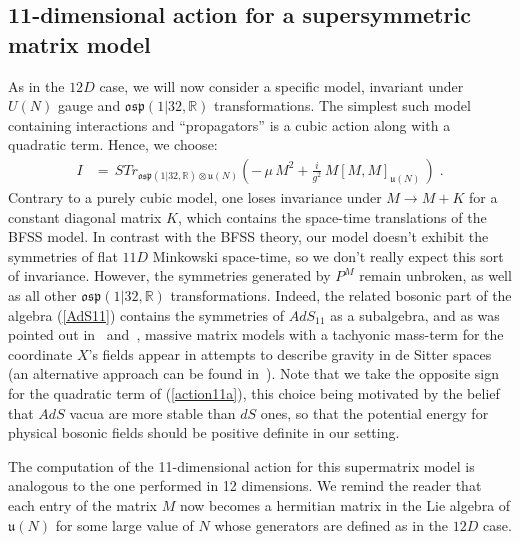 \documentclass[a4paper,11pt]{article}
\begin{document}
\subsection{11-dimensional action for a supersymmetric matrix model} 
As in the $12D$ case, we will now consider a specific model, invariant
under $U(N)$ gauge and $\mathfrak{osp}(1|32,\mathbb{R})$ transformations.
The simplest such model containing interactions and ``propagators'' is a
cubic action along with a quadratic term. 
Hence, we choose:
\begin{align}\label{action11a}
I & =\, STr_{\mathfrak{osp}(1|32,\mathbb{R})\otimes\mathfrak{u}(N)} 
\left(-\,\mu\, M^2 + \frac{i}{g^2}\,M[M,M]_{\mathfrak{u}(N)}\,\right)\;.
\end{align}
Contrary to a purely cubic model, one loses invariance under $M \rightarrow M+K$ for a constant
diagonal matrix $K$, which contains the space-time translations of the BFSS model.
In contrast with the BFSS theory, our model doesn't exhibit the symmetries of flat $11D$ Minkowski 
space-time, so we don't really expect this sort of invariance. 
However, the symmetries generated by $P^M$ remain unbroken, as well as all other 
$\mathfrak{osp}(1|32,\mathbb{R})$ transformations.  Indeed, the related
bosonic part of the algebra (\ref{AdS11}) contains the symmetries of $AdS_{11}$
as a subalgebra, and as was pointed out in~\cite{Gao} and~\cite{Cham}, massive
matrix models with a tachyonic mass-term for the coordinate $X$'s fields appear 
in attempts to describe gravity in de Sitter spaces (an alternative approach can
be found in~\cite{Li}). Note that we take the opposite sign for
the quadratic term of (\ref{action11a}), this choice being motivated by the belief that $AdS$ vacua are 
more stable than $dS$ ones, so that the potential energy for physical bosonic 
fields should be positive definite in our setting.   

The computation of the 11-dimensional action for this supermatrix model is analogous 
to the one performed in 12 dimensions. We remind the reader that each entry of the matrix $M$ 
now becomes a hermitian matrix in the Lie algebra of $\mathfrak{u}(N)$ for some
large value of $N$ whose generators are defined as in the $12D$ case.
\end{document}
